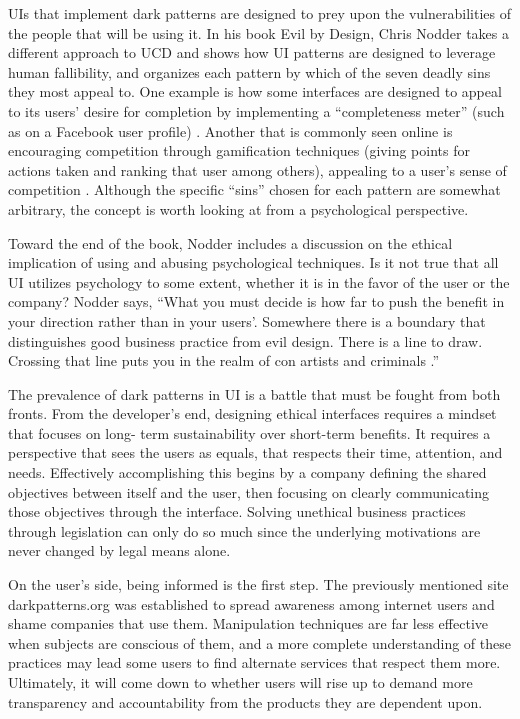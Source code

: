 \documentclass[12pt, oneside]{article}
\begin{document}
UIs that implement dark patterns are designed to prey upon the vulnerabilities of the people that will be using it. In his book Evil by Design, Chris Nodder takes a different approach to UCD and shows how UI patterns are designed to leverage human fallibility, and organizes each pattern by which of the seven deadly sins they most appeal to. One example is how some interfaces are designed to appeal to its users' desire for completion by implementing a ``completeness meter'' (such as on a Facebook user profile) \cite[p.~48]{nodder_2013}. Another that is commonly seen online is encouraging competition through gamification techniques (giving points for actions taken and ranking that user among others), appealing to a user's sense of competition \cite[p.~246]{nodder_2013}. Although the specific ``sins'' chosen for each pattern are somewhat arbitrary, the concept is worth looking at from a psychological perspective.

Toward the end of the book, Nodder includes a discussion on the ethical implication of using and abusing psychological techniques. Is it not true that all UI utilizes psychology to some extent, whether it is in the favor of the user or the company? Nodder says, ``What you must decide is how far to push the benefit in your direction rather than in your users’. Somewhere there is a boundary that distinguishes good business practice from evil design. There is a line to draw. Crossing that line puts you in the realm of con artists and criminals \cite[p.~293]{nodder_2013}.''

The prevalence of dark patterns in UI is a battle that must be fought from both fronts. From the developer's end, designing ethical interfaces requires a mindset that focuses on long- term sustainability over short-term benefits. It requires a perspective that sees the users as equals, that respects their time, attention, and needs. Effectively accomplishing this begins by a company defining the shared objectives between itself and the user, then focusing on clearly communicating those objectives through the interface. Solving unethical business practices through legislation can only do so much since the underlying motivations are never changed by legal means alone.

On the user's side, being informed is the first step. The previously mentioned site darkpatterns.org was established to spread awareness among internet users and shame companies that use them. Manipulation techniques are far less effective when subjects are conscious of them, and a more complete understanding of these practices may lead some users to find alternate services that respect them more. Ultimately, it will come down to whether users will rise up to demand more transparency and accountability from the products they are dependent upon.
\end{document}
